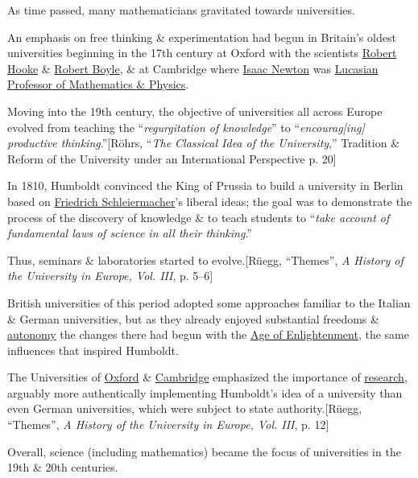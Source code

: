 \documentclass{article}
\begin{document}
%
As time passed, many mathematicians gravitated towards universities.

An emphasis on free thinking \& experimentation had begun in Britain's oldest universities beginning in the 17th century at Oxford with the scientists \href{https://en.wikipedia.org/wiki/Robert_Hooke}{Robert Hooke} \& \href{https://en.wikipedia.org/wiki/Robert_Boyle}{Robert Boyle}, \& at Cambridge where \href{https://en.wikipedia.org/wiki/Isaac_Newton}{Isaac Newton} was \href{https://en.wikipedia.org/wiki/Lucasian_Professor_of_Mathematics}{Lucasian Professor of Mathematics \& Physics}.

Moving into the 19th century, the objective of universities all across Europe evolved from teaching the ``\textit{regurgitation of knowledge}'' to ``\textit{encourag[ing] productive thinking}.''[Röhrs, ``\textit{The Classical Idea of the University},'' Tradition \& Reform of the University under an International Perspective p. 20]

In 1810, Humboldt convinced the King of Prussia to build a university in Berlin based on \href{https://en.wikipedia.org/wiki/Friedrich_Schleiermacher}{Friedrich Schleiermacher}'s liberal ideas; the goal was to demonstrate the process of the discovery of knowledge \& to teach students to ``\textit{take account of fundamental laws of science in all their thinking}.''

Thus, seminars \& laboratories started to evolve.[Rüegg, ``Themes'', \textit{A History of the University in Europe, Vol. III}, p. 5--6]

%
British universities of this period adopted some approaches familiar to the Italian \& German universities, but as they already enjoyed substantial freedoms \& \href{https://en.wikipedia.org/wiki/Autonomy}{autonomy} the changes there had begun with the \href{https://en.wikipedia.org/wiki/Age_of_Enlightenment}{Age of Enlightenment}, the same influences that inspired Humboldt.

The Universities of \href{https://en.wikipedia.org/wiki/University_of_Oxford}{Oxford} \& \href{https://en.wikipedia.org/wiki/University_of_Cambridge}{Cambridge} emphasized the importance of \href{https://en.wikipedia.org/wiki/Research}{research}, arguably more authentically implementing Humboldt's idea of a university than even German universities, which were subject to state authority.[Rüegg, ``Themes'', \textit{A History of the University in Europe, Vol. III}, p. 12]

Overall, science (including mathematics) became the focus of universities in the 19th \& 20th centuries.
\end{document}
